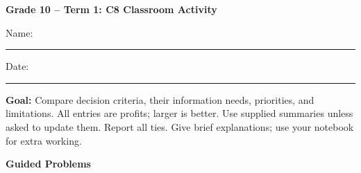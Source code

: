 \makeatletter
{}
\makeatother

\pagestyle{empty}
\newcommand{\answerlines}{\par\vspace{3mm}\hrule\vspace{3mm}\hrule\vspace{2mm}}
\newcommand{\choices}{\begin{center}\begin{tabular}{lcc}\toprule Criterion & Alternative(s) & Deciding quantity and value\\\midrule Maximax & \rule{25mm}{0.4pt} & \rule{45mm}{0.4pt}\\ Maximin & \rule{25mm}{0.4pt} & \rule{45mm}{0.4pt}\\ Minimax Regret & \rule{25mm}{0.4pt} & \rule{45mm}{0.4pt}\\ EMV/Bayes & \rule{25mm}{0.4pt} & \rule{45mm}{0.4pt}\\\bottomrule\end{tabular}\end{center}}

\begingroup\renewcommand{\baselinestretch}{1}\small
\setlength{\parskip}{3pt}\renewcommand{\arraystretch}{1.05}
\begin{center}{\large\bfseries Grade 10 -- Term 1: C8 Classroom Activity}\end{center}
Name: \rule{75mm}{0.4pt}\hfill Date: \rule{30mm}{0.4pt}

\textbf{Goal:} Compare decision criteria, their information needs, priorities, and limitations.
All entries are profits; larger is better. Use supplied summaries unless asked to update them. Report all ties. Give brief explanations; use your notebook for extra working.

\textbf{Guided Problems}

